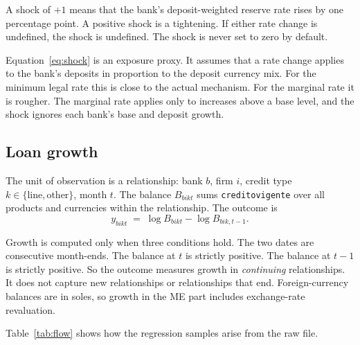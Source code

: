\documentclass[11pt]{article}
\newcommand{\code}[1]{\texttt{#1}}
\renewcommand{\_}{\origunderscore\hspace{0pt}}  %
\begin{document}
A shock of $+1$ means that the bank's deposit-weighted reserve rate rises by one percentage point.
A positive shock is a tightening.
If either rate change is undefined, the shock is undefined.
The shock is never set to zero by default.

Equation~\eqref{eq:shock} is an exposure proxy.
It assumes that a rate change applies to the bank's deposits in proportion to the deposit currency mix.
For the minimum legal rate this is close to the actual mechanism.
For the marginal rate it is rougher.
The marginal rate applies only to increases above a base level, and the shock ignores each bank's base and deposit growth.

\subsection{Loan growth}
\label{sec:growth}

The unit of observation is a relationship: bank $b$, firm $i$, credit type $k\in\{\text{line},\text{other}\}$, month $t$.
The balance $B_{bikt}$ sums \code{credito\_vigente} over all products and currencies within the relationship.
The outcome is
\begin{equation}
y_{bikt} \;=\; \log B_{bikt} - \log B_{bik,t-1}.
\label{eq:growth}
\end{equation}

Growth is computed only when three conditions hold.
The two dates are consecutive month-ends.
The balance at $t$ is strictly positive.
The balance at $t-1$ is strictly positive.
So the outcome measures growth in \textit{continuing} relationships.
It does not capture new relationships or relationships that end.
Foreign-currency balances are in soles, so growth in the ME part includes exchange-rate revaluation.

Table~\ref{tab:flow} shows how the regression samples arise from the raw file.
\end{document}
